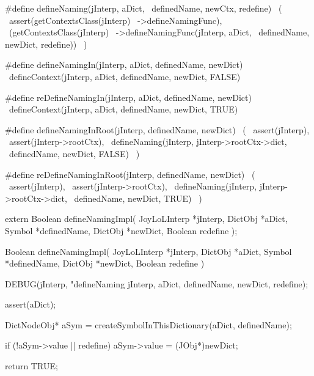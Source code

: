 #define defineNaming(jInterp, aDict,      \
  definedName, newCtx, redefine)          \
  (                                       \
    assert(getContextsClass(jInterp)      \
      ->defineNamingFunc),                \
    (getContextsClass(jInterp)            \
      ->defineNamingFunc(jInterp, aDict,  \
        definedName, newDict, redefine))  \
  )

#define defineNamingIn(jInterp, aDict, definedName, newDict)  \
  defineContext(jInterp, aDict, definedName, newDict, FALSE)

#define reDefineNamingIn(jInterp, aDict, definedName, newDict)  \
  defineContext(jInterp, aDict, definedName, newDict, TRUE)

#define defineNamingInRoot(jInterp, definedName, newDict) \
  (                                                       \
    assert(jInterp),                                      \
    assert(jInterp->rootCtx),                             \
    defineNaming(jInterp, jInterp->rootCtx->dict,         \
      definedName, newDict, FALSE)                        \
  )

#define reDefineNamingInRoot(jInterp, definedName, newDict) \
  (                                                         \
    assert(jInterp),                                        \
    assert(jInterp->rootCtx),                               \
    defineNaming(jInterp, jInterp->rootCtx->dict,           \
      definedName, newDict, TRUE)                           \
  )
\stopCHeader

\setCHeaderStream{private}
\startCHeader
extern Boolean defineNamingImpl(
  JoyLoLInterp *jInterp,
  DictObj      *aDict,
  Symbol       *definedName,
  DictObj      *newDict,
  Boolean       redefine
);
\stopCHeader
\setCHeaderStream{public}

\startCCode
Boolean defineNamingImpl(
  JoyLoLInterp *jInterp,
  DictObj      *aDict,
  Symbol       *definedName,
  DictObj      *newDict,
  Boolean       redefine
) {
  DEBUG(jInterp, "defineNaming %
        jInterp, aDict, definedName, newDict, redefine);

  assert(aDict);
  
  DictNodeObj* aSym =
    createSymbolInThisDictionary(aDict, definedName);

  if (!aSym->value || redefine) {
    aSym->value   = (JObj*)newDict;
  }

  return TRUE;
}
\stopCCode
